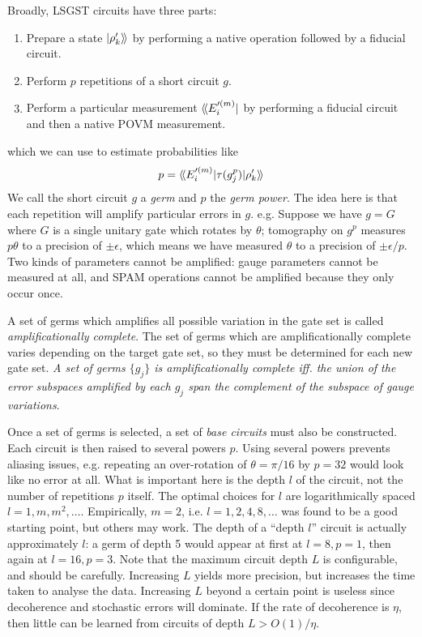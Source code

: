 Broadly, \ac{LSGST} circuits have three parts:
\begin{enumerate}
    \item Prepare a state $\ket{\rho_k'}\!\rangle$ by performing a native operation followed by a
    fiducial circuit.
    \item Perform $p$ repetitions of a short circuit $g$.
    \item Perform a particular measurement $\langle\!\bra{E_i'^{(m)}}$ by performing a fiducial circuit
    and then a native \ac{POVM} measurement.
\end{enumerate}
which we can use to estimate probabilities like
\begin{equation}
    p = \langle\!\braket{E_i'^{(m)} | \tau(g_j^p) | \rho_k'}\!\rangle
\end{equation}
We call the short circuit $g$ a \textit{germ} and $p$ the \textit{germ power}. The idea here is that
each repetition will amplify particular errors in $g$. e.g. Suppose we have $g = G$ where $G$ is a
single unitary gate which rotates by $\theta$; tomography on $g^p$ measures $p\theta$ to a precision
of $\pm \epsilon$, which means we have measured $\theta$ to a precision of $\pm \epsilon / p$. Two
kinds of parameters cannot be amplified: gauge parameters cannot be measured at all, and SPAM
operations cannot be amplified because they only occur once.

A set of germs which amplifies all possible variation in the gate set is called
\textit{amplificationally complete}. The set of germs which are amplificationally complete varies
depending on the target gate set, so they must be determined for each new gate set. \textit{A set of
germs $\{g_j\}$ is amplificationally complete iff. the union of the error subspaces amplified by
each $g_j$ span the complement of the subspace of gauge variations}. 

Once a set of germs is selected, a set of \textit{base circuits} must also be constructed. Each
circuit is then raised to several powers $p$. Using several powers prevents aliasing issues, e.g.
repeating an over-rotation of $\theta = \pi / 16$ by $p = 32$ would look like no error at all. What
is important here is the depth $l$ of the circuit, not the number of repetitions $p$ itself. The
optimal choices for $l$ are logarithmically spaced $l = 1, m, m^2, \dots$. Empirically, $m = 2$, i.e.
$l = 1, 2, 4, 8, \dots$ was found to be a good starting point, but others may work. The depth of a
``depth $l$'' circuit is actually approximately $l$: a germ of depth 5 would appear at first at $l =
8, p = 1$, then again at $l = 16, p = 3$. Note that the maximum circuit depth $L$ is configurable,
and should be carefully. Increasing $L$ yields more precision, but increases the time taken to
analyse the data. Increasing $L$ beyond a certain point is useless since decoherence and stochastic
errors will dominate. If the rate of decoherence is $\eta$, then little can be learned from circuits
of depth $L > O(1) / \eta$.

